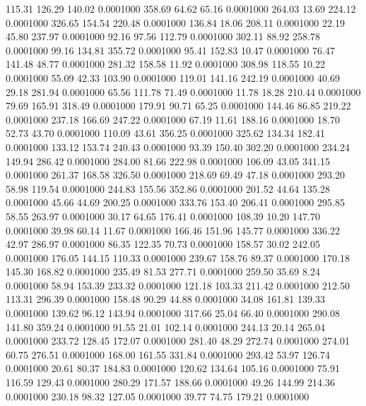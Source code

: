  115.31  126.29  140.02   0.0001000
 358.69   64.62   65.16   0.0001000
 264.03   13.69  224.12   0.0001000
 326.65  154.54  220.48   0.0001000
 136.84   18.06  208.11   0.0001000
  22.19   45.80  237.97   0.0001000
  92.16   97.56  112.79   0.0001000
 302.11   88.92  258.78   0.0001000
  99.16  134.81  355.72   0.0001000
  95.41  152.83   10.47   0.0001000
  76.47  141.48   48.77   0.0001000
 281.32  158.58   11.92   0.0001000
 308.98  118.55   10.22   0.0001000
  55.09   42.33  103.90   0.0001000
 119.01  141.16  242.19   0.0001000
  40.69   29.18  281.94   0.0001000
  65.56  111.78   71.49   0.0001000
  11.78   18.28  210.44   0.0001000
  79.69  165.91  318.49   0.0001000
 179.91   90.71   65.25   0.0001000
 144.46   86.85  219.22   0.0001000
 237.18  166.69  247.22   0.0001000
  67.19   11.61  188.16   0.0001000
  18.70   52.73   43.70   0.0001000
 110.09   43.61  356.25   0.0001000
 325.62  134.34  182.41   0.0001000
 133.12  153.74  240.43   0.0001000
  93.39  150.40  302.20   0.0001000
 234.24  149.94  286.42   0.0001000
 284.00   81.66  222.98   0.0001000
 106.09   43.05  341.15   0.0001000
 261.37  168.58  326.50   0.0001000
 218.69   69.49   47.18   0.0001000
 293.20   58.98  119.54   0.0001000
 244.83  155.56  352.86   0.0001000
 201.52   44.64  135.28   0.0001000
  45.66   44.69  200.25   0.0001000
 333.76  153.40  206.41   0.0001000
 295.85   58.55  263.97   0.0001000
  30.17   64.65  176.41   0.0001000
 108.39   10.20  147.70   0.0001000
  39.98   60.14   11.67   0.0001000
 166.46  151.96  145.77   0.0001000
 336.22   42.97  286.97   0.0001000
  86.35  122.35   70.73   0.0001000
 158.57   30.02  242.05   0.0001000
 176.05  144.15  110.33   0.0001000
 239.67  158.76   89.37   0.0001000
 170.18  145.30  168.82   0.0001000
 235.49   81.53  277.71   0.0001000
 259.50   35.69    8.24   0.0001000
  58.94  153.39  233.32   0.0001000
 121.18  103.33  211.42   0.0001000
 212.50  113.31  296.39   0.0001000
 158.48   90.29   44.88   0.0001000
  34.08  161.81  139.33   0.0001000
 139.62   96.12  143.94   0.0001000
 317.66   25.04   66.40   0.0001000
 290.08  141.80  359.24   0.0001000
  91.55   21.01  102.14   0.0001000
 244.13   20.14  265.04   0.0001000
 233.72  128.45  172.07   0.0001000
 281.40   48.29  272.74   0.0001000
 274.01   60.75  276.51   0.0001000
 168.00  161.55  331.84   0.0001000
 293.42   53.97  126.74   0.0001000
  20.61   80.37  184.83   0.0001000
 120.62  134.64  105.16   0.0001000
  75.91  116.59  129.43   0.0001000
 280.29  171.57  188.66   0.0001000
  49.26  144.99  214.36   0.0001000
 230.18   98.32  127.05   0.0001000
  39.77   74.75  179.21   0.0001000
